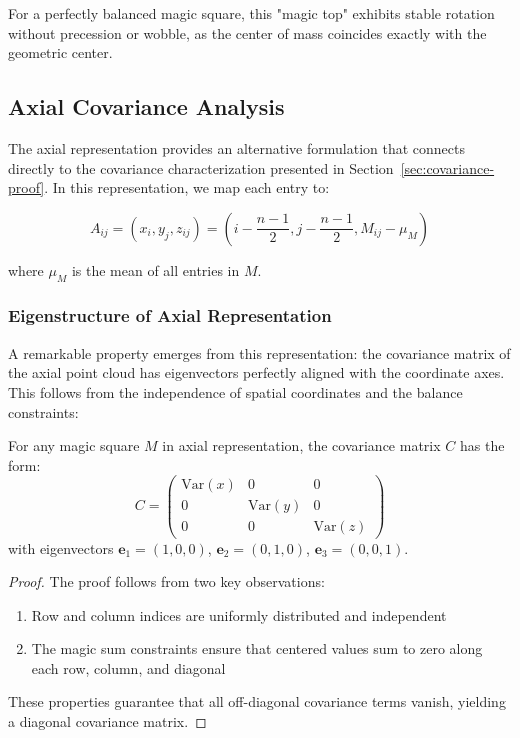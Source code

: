 For a perfectly balanced magic square, this "magic top" exhibits stable rotation without precession or wobble, as the center of mass coincides exactly with the geometric center.

\subsection{Axial Covariance Analysis}

The axial representation provides an alternative formulation that connects directly to the covariance characterization presented in Section~\ref{sec:covariance-proof}. In this representation, we map each entry to:

\[A_{ij} = (x_i, y_j, z_{ij}) = \left(i - \frac{n-1}{2}, j - \frac{n-1}{2}, M_{ij} - \mu_M\right)\]

where $\mu_M$ is the mean of all entries in $M$.

\subsubsection{Eigenstructure of Axial Representation}

A remarkable property emerges from this representation: the covariance matrix of the axial point cloud has eigenvectors perfectly aligned with the coordinate axes. This follows from the independence of spatial coordinates and the balance constraints:

\begin{theorem}
For any magic square $M$ in axial representation, the covariance matrix $C$ has the form:
\[C = \begin{pmatrix}
\text{Var}(x) & 0 & 0 \\
0 & \text{Var}(y) & 0 \\
0 & 0 & \text{Var}(z)
\end{pmatrix}\]
with eigenvectors $\mathbf{e}_1 = (1,0,0)$, $\mathbf{e}_2 = (0,1,0)$, $\mathbf{e}_3 = (0,0,1)$.
\end{theorem}

\begin{proof}
The proof follows from two key observations:
\begin{enumerate}
    \item Row and column indices are uniformly distributed and independent
    \item The magic sum constraints ensure that centered values sum to zero along each row, column, and diagonal
\end{enumerate}
These properties guarantee that all off-diagonal covariance terms vanish, yielding a diagonal covariance matrix.
\end{proof}

